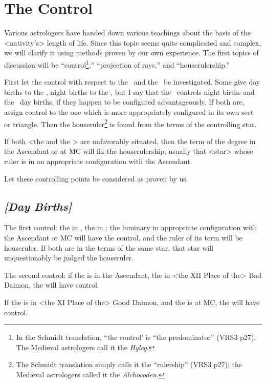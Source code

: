 \section{The Control}
Various astrologers have handed down various teachings about the basis of the <nativity’s> length of life. Since this topic seems quite complicated and complex, we will clarify it using methods proven by our own experience. The first topics of discussion will be “control\footnote{In the Schmidt translation, ``the control' is ``the predominator'' (VRS3 p27). The Medieval astrologers call it the \textsl{Hyleg}.},” “projection of rays,” and “houserulership.” 

First \mndl let the control with respect to the \Sun\, and the \Moon\, be investigated. Some give day births to the \Sun, night births to the \Moon, but I say that the \Sun\, controls night births and the \Moon\, day births, if they happen to be configured advantageously. If both are, assign control to the one which is more appropriately configured in its own sect or triangle. Then the houseruler\footnote{The Schmidt translation simply calls it the ``rulership'' (VRS3 p27); the Medieval astrologers called it the \textsl{Alchocoden}.} is found from the terms of the controlling star. 

If both <the \Sun\xspace and the \Moon> are unfavorably situated, then the term of the degree in the Ascendant or at MC will fix the houserulership, usually that <star> whose ruler is in an appropriate configuration with the Ascendant.

Let these controlling points be considered as proven by us. 

\subsection{\textit{[Day Births]}}
The first control: the \Sun\xspace in \Leo, the \Moon\xspace in \Cancer; the luminary in appropriate configuration with the Ascendant or MC will have the control, and the ruler of its term will be houseruler. If both are in the terms of the same star, that star will unquestionably be judged the houseruler.

The second control: if the \Sun\xspace is in the Ascendant, the \Moon\xspace in <the XII Place of the> Bad Daimon, the \Sun\xspace will have control. 

If the \Sun\xspace is in <the XI Place of the> Good Daimon, and the \Moon\xspace is at MC, the \Sun\xspace will have control. 

